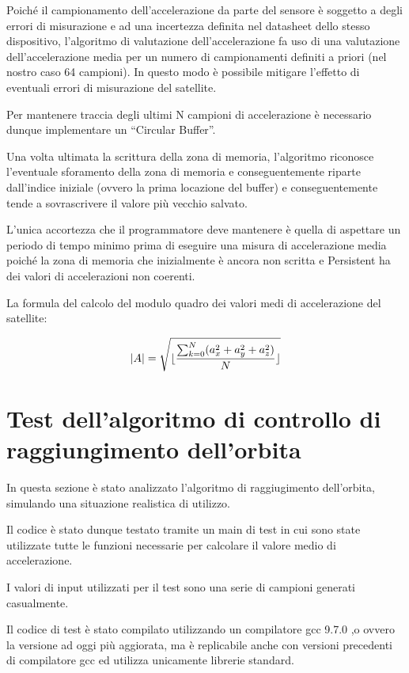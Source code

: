 \documentclass[LaM,binding=0.6cm]{../sapthesis}
\DeclarePairedDelimiter\floor{\lfloor}{\rfloor}
\begin{document}
Poiché il campionamento dell’accelerazione da parte del sensore è soggetto a degli errori di misurazione e ad una incertezza definita nel datasheet dello stesso dispositivo, l’algoritmo di valutazione dell’accelerazione fa uso di una valutazione dell’accelerazione media per un numero di campionamenti definiti a priori (nel nostro caso 64 campioni).
In questo modo è possibile mitigare l’effetto di eventuali errori di misurazione del satellite.

Per mantenere traccia degli ultimi N campioni di accelerazione è necessario dunque implementare un “Circular Buffer”.

Una volta ultimata la scrittura della zona di memoria, l’algoritmo riconosce l’eventuale sforamento della zona di memoria e conseguentemente riparte dall’indice iniziale (ovvero la prima locazione del buffer) e conseguentemente tende a sovrascrivere il valore più vecchio salvato.

L’unica accortezza che il programmatore deve mantenere è quella di aspettare un periodo di tempo minimo prima di eseguire una misura di accelerazione media poiché la zona di memoria che inizialmente è ancora non scritta e Persistent ha dei valori di accelerazioni non coerenti.

La formula del calcolo del modulo quadro dei valori medi di accelerazione del satellite:

\begin{equation}
    |A| = \sqrt{\floor{\frac{\sum_{k=0}^N (a_x^2+a_y^2+a_z^2) }{N} } }
\end{equation}

\section{Test dell'algoritmo di controllo di raggiungimento dell'orbita}

In questa sezione è stato analizzato l'algoritmo di raggiugimento dell'orbita, simulando una situazione realistica di utilizzo.

Il codice è stato dunque testato tramite un main di test in cui sono state utilizzate tutte le funzioni necessarie per calcolare il valore medio di accelerazione.

I valori di input utilizzati per il test sono una serie di campioni generati casualmente.

Il codice di test è stato compilato utilizzando un compilatore gcc 9.7.0 ,o ovvero la versione ad oggi più aggiorata, ma è replicabile anche con versioni precedenti di compilatore gcc ed utilizza unicamente librerie standard.
\end{document}
